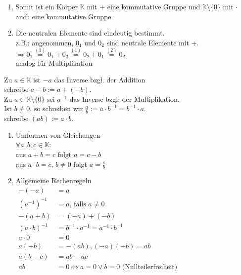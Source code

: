 \documentclass[../ana1.tex]{subfiles}
\begin{document}
\begin{bem}
	\begin{enumerate}\leavevmode
		\item Somit ist ein Körper \(\mathbb{K}\) mit \glqq\(+\)\grqq{} eine kommutative Gruppe und \(\mathbb{K} \setminus \{0\}\) mit \glqq{}\(\cdot\)\grqq{} auch eine kommutative Gruppe.
		\item Die neutralen Elemente sind eindeutig bestimmt.\\
		      z.B.: angenommen, \(0_1\) und \(0_2\) sind neutrale Elemente mit \glqq{}\(+\)\grqq{}. \\
		      \(\Rightarrow 0_1 \overset{(3)}{=} 0_1 + 0_2 \overset{(1)}{=} 0_2 + 0_1 \overset{(2)}{=} 0_2\) \\
		      analog für Multiplikation
	\end{enumerate}
\end{bem}
\begin{defi}
	Zu \(a\in \mathbb{K}\) ist \(-a\) das Inverse bzgl. der Addition\\
	schreibe \(a-b := a + (-b)\).\\
	Zu \(a\in\mathbb{K}\setminus\{0\}\) sei \( a^{-1} \) das Inverse bzgl. der Multiplikation.\\
	Ist \(b\neq 0\), so schreiben wir \(\frac{a}{b} := a\cdot b^{-1} =b^{-1}\cdot a\).\\
	schreibe \((ab) := a\cdot b\).
\end{defi}
\begin{lem}\leavevmode
	\begin{enumerate}
		\item Umformen von Gleichungen\\
		      \(\forall a,b,c\in\mathbb{K}\):\\
		      aus \(a+b=c\) folgt \(a=c-b\) \\
		      aus \(a\cdot b=c\), \(b\neq 0\) folgt \(a=\frac{c}{b}\)
		\item Allgemeine Rechenregeln\\
			\(\begin{aligned}
				-(-a)             & = a                                                               \\
				{(a^{-1})}^{-1}   & =a\text{, falls } a \neq 0                                        \\
				-(a+b)            & = (-a) + (-b)                                                     \\
				{(a\cdot b)}^{-1} & =b^{-1}\cdot a^{-1} = a^{-1}\cdot b^{-1}                          \\
				a\cdot 0          & =0                                                                \\
				a(-b)             & =-(ab), (-a)(-b)=ab                                               \\
				a(b-c)            & = ab - ac                                                         \\
				ab                & = 0 \Leftrightarrow a = 0 \vee b = 0 \text{ (Nullteilerfreiheit)} \\
			\end{aligned}\)
	\end{enumerate}
\end{lem}
\end{document}
